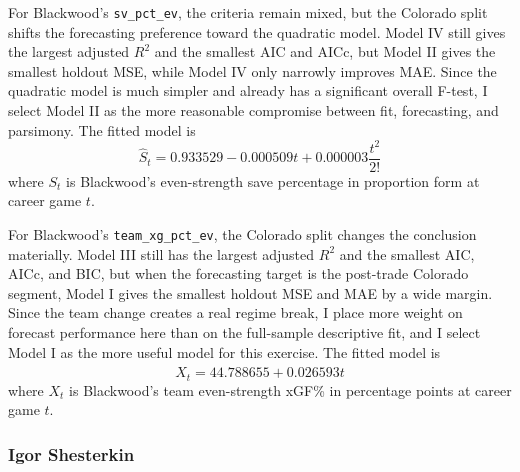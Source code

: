 \documentclass[
  10pt,
]{extarticle}
\begin{document}
For Blackwood's \texttt{sv\_pct\_ev}, the criteria remain mixed, but the Colorado split shifts the forecasting preference toward the quadratic model. Model IV still gives the largest adjusted \(R^2\) and the smallest AIC and AICc, but Model II gives the smallest holdout MSE, while Model IV only narrowly improves MAE. Since the quadratic model is much simpler and already has a significant overall F-test, I select Model II as the more reasonable compromise between fit, forecasting, and parsimony. The fitted model is
\[
\widehat{S}_t = 0.933529 - 0.000509 t + 0.000003 \frac{t^2}{2!}
\]
where \(S_t\) is Blackwood's even-strength save percentage in proportion form at career game \(t\).

For Blackwood's \texttt{team\_xg\_pct\_ev}, the Colorado split changes the conclusion materially. Model III still has the largest adjusted \(R^2\) and the smallest AIC, AICc, and BIC, but when the forecasting target is the post-trade Colorado segment, Model I gives the smallest holdout MSE and MAE by a wide margin. Since the team change creates a real regime break, I place more weight on forecast performance here than on the full-sample descriptive fit, and I select Model I as the more useful model for this exercise. The fitted model is
\[
\widehat{X}_t = 44.788655 + 0.026593 t
\]
where \(X_t\) is Blackwood's team even-strength xGF\% in percentage points at career game \(t\).

\subsubsection{Igor Shesterkin}\label{igor-shesterkin}
\end{document}
